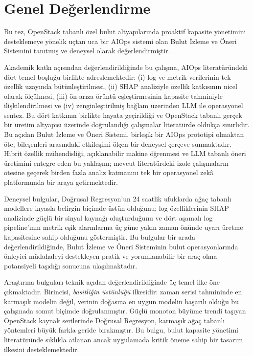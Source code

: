 \section{Genel Değerlendirme}

Bu tez, OpenStack tabanlı özel bulut altyapılarında proaktif kapasite yönetimini desteklemeye yönelik uçtan uca bir AIOps sistemi olan Bulut İzleme ve Öneri Sistemini tanıtmış ve deneysel olarak değerlendirmiştir.

Akademik katkı açısından değerlendirildiğinde bu çalışma, AIOps literatüründeki dört temel boşluğu birlikte adreslemektedir: (i) log ve metrik verilerinin tek özellik uzayında bütünleştirilmesi, (ii) SHAP analiziyle özellik katkısının nicel olarak ölçülmesi, (iii) ön-arıza örüntü eşleştirmesinin kapasite tahminiyle ilişkilendirilmesi ve (iv) zenginleştirilmiş bağlam üzerinden LLM ile operasyonel sentez.
Bu dört katkının birlikte hayata geçirildiği ve OpenStack tabanlı gerçek bir üretim altyapısı üzerinde doğrulandığı çalışmalar literatürde oldukça sınırlıdır.
Bu açıdan Bulut İzleme ve Öneri Sistemi, birleşik bir AIOps prototipi olmaktan öte, bileşenleri arasındaki etkileşimi ölçen bir deneysel çerçeve sunmaktadır.
Hibrit özellik mühendisliği, açıklanabilir makine öğrenmesi ve LLM tabanlı öneri üretimini entegre eden bu yaklaşım; mevcut literatürdeki izole çalışmaların ötesine geçerek birden fazla analiz katmanını tek bir operasyonel zekâ platformunda bir araya getirmektedir.

Deneysel bulgular, Doğrusal Regresyon'un 24 saatlik ufuklarda ağaç tabanlı modellere kıyasla belirgin biçimde üstün olduğunu; log özelliklerinin SHAP analizinde güçlü bir sinyal kaynağı oluşturduğunu ve dört aşamalı log pipeline'ının metrik eşik alarmlarına üç güne yakın zaman önünde uyarı üretme kapasitesine sahip olduğunu göstermiştir.
Bu bulgular bir arada değerlendirildiğinde, Bulut İzleme ve Öneri Sisteminin bulut operasyonlarında önleyici müdahaleyi destekleyen pratik ve yorumlanabilir bir araç olma potansiyeli taşıdığı sonucuna ulaşılmaktadır.

Araştırma bulguları teknik açıdan değerlendirildiğinde üç temel ilke öne çıkmaktadır.
Birincisi, \textit{basitliğin üstünlüğü} ilkesidir: zaman serisi tahmininde en karmaşık modelin değil, verinin doğasına en uygun modelin başarılı olduğu bu çalışmada somut biçimde doğrulanmıştır.
Güçlü monoton büyüme trendi taşıyan OpenStack kaynak serilerinde Doğrusal Regresyon, karmaşık ağaç tabanlı yöntemleri büyük farkla geride bırakmıştır.
Bu bulgu, bulut kapasite yönetimi literatüründe sıklıkla atlanan ancak uygulamada kritik öneme sahip bir tasarım ilkesini desteklemektedir.

